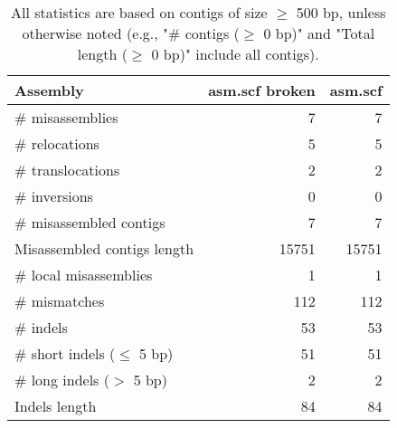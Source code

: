 \documentclass[12pt,a4paper]{article}
\begin{document}
\begin{table}[ht]
\begin{center}
\caption{All statistics are based on contigs of size $\geq$ 500 bp, unless otherwise noted (e.g., "\# contigs ($\geq$ 0 bp)" and "Total length ($\geq$ 0 bp)" include all contigs).}
\begin{tabular}{|l*{2}{|r}|}
\hline
Assembly & asm.scf broken & asm.scf \\ \hline
\# misassemblies & 7 & 7 \\ \hline
\hspace{5mm}\# relocations & 5 & 5 \\ \hline
\hspace{5mm}\# translocations & 2 & 2 \\ \hline
\hspace{5mm}\# inversions & 0 & 0 \\ \hline
\# misassembled contigs & 7 & 7 \\ \hline
Misassembled contigs length & 15751 & 15751 \\ \hline
\# local misassemblies & 1 & 1 \\ \hline
\# mismatches & 112 & 112 \\ \hline
\# indels & 53 & 53 \\ \hline
\hspace{5mm}\# short indels ($\leq$ 5 bp) & 51 & 51 \\ \hline
\hspace{5mm}\# long indels ($>$ 5 bp) & 2 & 2 \\ \hline
Indels length & 84 & 84 \\ \hline
\end{tabular}
\end{center}
\end{table}
\end{document}
